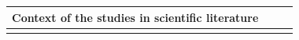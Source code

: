 \documentclass[english, 12pt, a4paper, sci, utf8, a-1b, online]{aaltothesis}
\begin{document}
\clearpage
\renewcommand{\arraystretch}{1.5}
\begin{center}
  \begin{longtable}{p{0.3\linewidth}p{0.6\linewidth}}
    \multicolumn{2}{l}{\textbf{Context of the studies in scientific literature}}                                                                                                                                                                                                                                                                                                                                                                                                                                                                                                                                                                                                                                                                                                                                                                                                                                           \\
    \hline                                                                                                                                                                                                                                                                                                                                                                                                                                                                                                                                                                                                                                                                                                                                                                                                                                                                              \\

\end{longtable}
\end{center}
\end{document}
